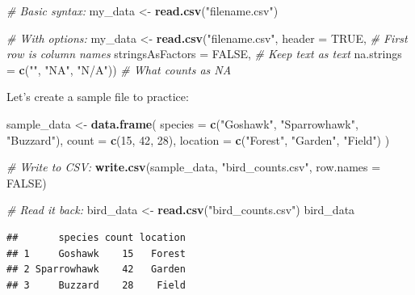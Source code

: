 \documentclass[
]{article}
\newenvironment{Shaded}{\begin{snugshade}}{\end{snugshade}}
\newcommand{\AttributeTok}[1]{\textcolor[rgb]{0.13,0.29,0.53}{#1}}
\newcommand{\CommentTok}[1]{\textcolor[rgb]{0.56,0.35,0.01}{\textit{#1}}}
\newcommand{\ConstantTok}[1]{\textcolor[rgb]{0.56,0.35,0.01}{#1}}
\newcommand{\DecValTok}[1]{\textcolor[rgb]{0.00,0.00,0.81}{#1}}
\newcommand{\FunctionTok}[1]{\textcolor[rgb]{0.13,0.29,0.53}{\textbf{#1}}}
\newcommand{\NormalTok}[1]{#1}
\newcommand{\OtherTok}[1]{\textcolor[rgb]{0.56,0.35,0.01}{#1}}
\newcommand{\StringTok}[1]{\textcolor[rgb]{0.31,0.60,0.02}{#1}}
\begin{document}
\begin{Shaded}
\begin{Highlighting}[]
\CommentTok{\# Basic syntax:}
\NormalTok{my\_data }\OtherTok{\textless{}{-}} \FunctionTok{read.csv}\NormalTok{(}\StringTok{"filename.csv"}\NormalTok{)}

\CommentTok{\# With options:}
\NormalTok{my\_data }\OtherTok{\textless{}{-}} \FunctionTok{read.csv}\NormalTok{(}\StringTok{"filename.csv"}\NormalTok{,}
                    \AttributeTok{header =} \ConstantTok{TRUE}\NormalTok{,              }\CommentTok{\# First row is column names}
                    \AttributeTok{stringsAsFactors =} \ConstantTok{FALSE}\NormalTok{,   }\CommentTok{\# Keep text as text}
                    \AttributeTok{na.strings =} \FunctionTok{c}\NormalTok{(}\StringTok{""}\NormalTok{, }\StringTok{"NA"}\NormalTok{, }\StringTok{"N/A"}\NormalTok{))  }\CommentTok{\# What counts as NA}
\end{Highlighting}
\end{Shaded}

Let's create a sample file to practice:

\begin{Shaded}
\begin{Highlighting}[]
\NormalTok{sample\_data }\OtherTok{\textless{}{-}} \FunctionTok{data.frame}\NormalTok{(}
  \AttributeTok{species =} \FunctionTok{c}\NormalTok{(}\StringTok{"Goshawk"}\NormalTok{, }\StringTok{"Sparrowhawk"}\NormalTok{, }\StringTok{"Buzzard"}\NormalTok{),}
  \AttributeTok{count =} \FunctionTok{c}\NormalTok{(}\DecValTok{15}\NormalTok{, }\DecValTok{42}\NormalTok{, }\DecValTok{28}\NormalTok{),}
  \AttributeTok{location =} \FunctionTok{c}\NormalTok{(}\StringTok{"Forest"}\NormalTok{, }\StringTok{"Garden"}\NormalTok{, }\StringTok{"Field"}\NormalTok{)}
\NormalTok{)}

\CommentTok{\# Write to CSV:}
\FunctionTok{write.csv}\NormalTok{(sample\_data, }\StringTok{"bird\_counts.csv"}\NormalTok{, }\AttributeTok{row.names =} \ConstantTok{FALSE}\NormalTok{)}

\CommentTok{\# Read it back:}
\NormalTok{bird\_data }\OtherTok{\textless{}{-}} \FunctionTok{read.csv}\NormalTok{(}\StringTok{"bird\_counts.csv"}\NormalTok{)}
\NormalTok{bird\_data}
\end{Highlighting}
\end{Shaded}

\begin{verbatim}
##       species count location
## 1     Goshawk    15   Forest
## 2 Sparrowhawk    42   Garden
## 3     Buzzard    28    Field
\end{verbatim}
\end{document}
